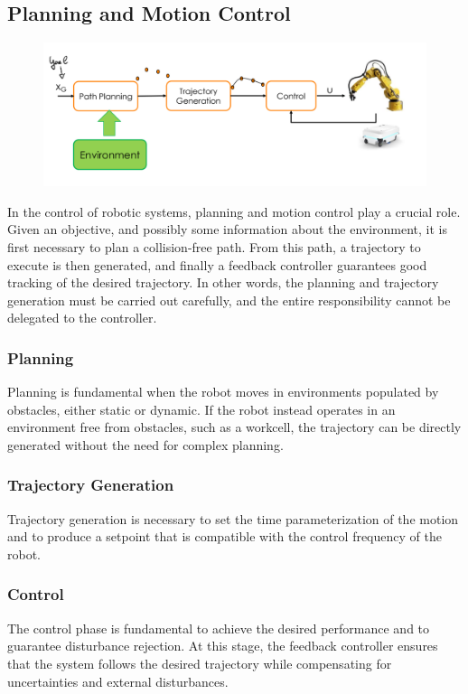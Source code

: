 \hfill

\subsection{Planning and Motion Control}

\begin{figure}
    \centering
    \includegraphics[width=1\linewidth]{imgs/planning_and_motion_control.png}
\end{figure}

In the control of robotic systems, planning and motion control play a crucial role.  
Given an objective, and possibly some information about the environment, it is first necessary to plan a collision-free path. From this path, a trajectory to execute is then generated, and finally a feedback controller guarantees good tracking of the desired trajectory.  
In other words, the planning and trajectory generation must be carried out carefully, and the entire responsibility cannot be delegated to the controller.

\subsubsection*{Planning}
Planning is fundamental when the robot moves in environments populated by obstacles, either static or dynamic.  
If the robot instead operates in an environment free from obstacles, such as a workcell, the trajectory can be directly generated without the need for complex planning.

\subsubsection*{Trajectory Generation}
Trajectory generation is necessary to set the time parameterization of the motion and to produce a setpoint that is compatible with the control frequency of the robot.

\subsubsection*{Control}
The control phase is fundamental to achieve the desired performance and to guarantee disturbance rejection.  
At this stage, the feedback controller ensures that the system follows the desired trajectory while compensating for uncertainties and external disturbances.

